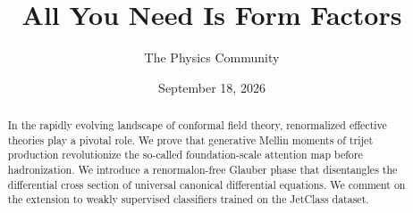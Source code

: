 \documentclass[11pt]{article}
\title{All You Need Is Form Factors}
\author{The Physics Community}
\date{September 18, 2026}
\begin{document}
\maketitle
\begin{abstract}
In the rapidly evolving landscape of conformal field theory,
renormalized effective theories play a pivotal role. We prove that
generative Mellin moments of trijet production revolutionize the
so-called foundation-scale attention map before hadronization. We
introduce a renormalon-free Glauber phase that disentangles the
differential cross section of universal canonical differential
equations. We comment on the extension to weakly supervised classifiers
trained on the JetClass dataset.
\end{abstract}
\tableofcontents





\nocite{*}


\end{document}
